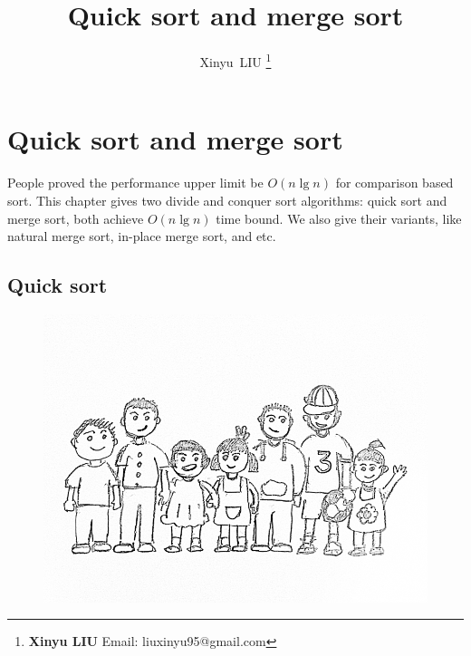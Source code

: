 \documentclass[b5paper]{article}
\begin{document}
\title{Quick sort and merge sort}

\author{Xinyu~LIU
\thanks{{\bfseries Xinyu LIU} \newline
  Email: liuxinyu95@gmail.com \newline}
  }

\maketitle
\fi


\ifx\wholebook\relax
\chapter{Quick sort and merge sort}
\fi

People proved the performance upper limit be $O(n \lg n)$ for comparison based sort\cite{TAOCP}. This chapter gives two divide and conquer sort algorithms: quick sort and merge sort, both achieve $O(n \lg n)$ time bound. We also give their variants, like natural merge sort, in-place merge sort, and etc.

\section{Quick sort}

\begin{figure}[htbp]
 \centering
 \includegraphics[scale=0.3]{img/kids}
 \captionsetup{labelformat = empty}
 \label{fig:knuth-ssort}
\end{figure}
\end{document}
